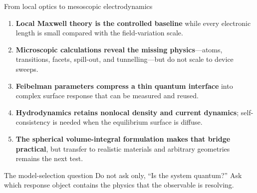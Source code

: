 \documentclass[aspectratio=169,10pt]{beamer}
\newcommand{\key}[1]{\textcolor{teal!80!black}{\textbf{#1}}}
\begin{document}
\begin{frame}{From local optics to mesoscopic electrodynamics}
\begin{enumerate}
  \item \key{Local Maxwell theory is the controlled baseline} while every electronic length is small compared with the field-variation scale.
  \item \key{Microscopic calculations reveal the missing physics}—atoms, transitions, facets, spill-out, and tunnelling—but do not scale to device sweeps.
  \item \key{Feibelman parameters compress a thin quantum interface} into complex surface response that can be measured and reused.
  \item \key{Hydrodynamics retains nonlocal density and current dynamics}; self-consistency is needed when the equilibrium surface is diffuse.
  \item \key{The spherical volume-integral formulation makes that bridge practical}, but transfer to realistic materials and arbitrary geometries remains the next test.
\end{enumerate}
\vspace{0.45em}
\begin{block}{The model-selection question}
  Do not ask only, ``Is the system quantum?'' Ask which response object contains the physics that the observable is resolving.
\end{block}
\end{frame}
\end{document}
